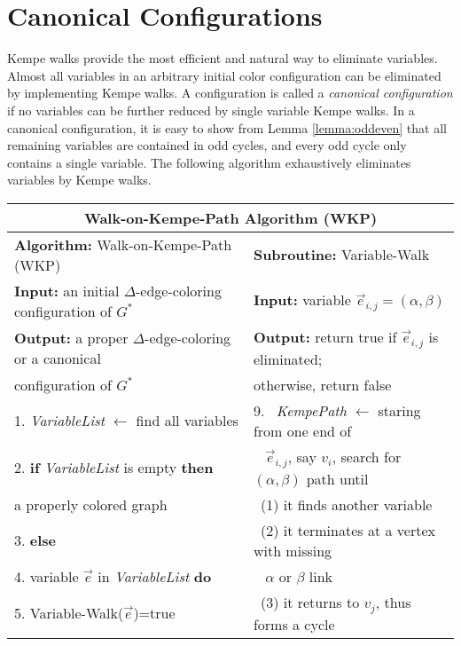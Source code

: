 \documentclass[11pt]{article}
\begin{document}
\section{Canonical Configurations}
Kempe walks provide the most efficient and natural way to eliminate variables. Almost all variables in an arbitrary initial color configuration can be eliminated by implementing Kempe walks. A configuration is called a {\it canonical configuration} if no variables can be further reduced by single variable Kempe walks. In a canonical configuration, it is easy to show from Lemma \ref{lemma:oddeven} that all remaining variables are contained in odd cycles, and every odd cycle only contains a single variable. The following algorithm exhaustively eliminates variables by Kempe walks.

\begin{table}[htbp]
	\centering
	{\footnotesize
			\begin{tabular}{|l|l| } \hline
			\multicolumn{2}{|c|}{Walk-on-Kempe-Path Algorithm (WKP)} \\ \hline
			{\bf Algorithm:} Walk-on-Kempe-Path (WKP)                        &  {\bf Subroutine:} Variable-Walk \\
 			{\bf Input:} an initial $\Delta$-edge-coloring configuration of $G^*$ &  {\bf Input:} variable $\vec{e}_{i,j}=(\alpha,\beta)$ \\
 			{\bf Output:} a proper $\Delta$-edge-coloring or a canonical            &  {\bf Output:} return true if $\vec{e}_{i,j}$ is eliminated;\\
			 configuration of $G^*$                           &  otherwise, return false \\            
			1. {\it VariableList} $\leftarrow$ find all variables            &  9. ~{\it KempePath} $\leftarrow$ staring from one end  of \\
			2. {\bf if}  {\it VariableList} is empty {\bf then}              &  \quad ~ $\vec{e}_{i,j}$, say $v_i$, search for $(\alpha,\beta)$ path until  \\
			\quad {\bf return} a properly colored graph                      &  \quad ~(1) it finds another variable   \\
			3. {\bf else}                                                    &  \quad ~(2) it terminates at a vertex with missing\\ 
			4. \quad {\bf for each} variable $\vec{e}$ in {\it VariableList} {\bf do}  & \quad ~ $\alpha$ or $\beta$ link\\
			5. \quad \quad {\bf if} Variable-Walk($\vec{e}$)=true            &  \quad ~(3) it returns to $v_j$, thus forms a cycle \\

\end{tabular}}
\end{table}
\end{document}

